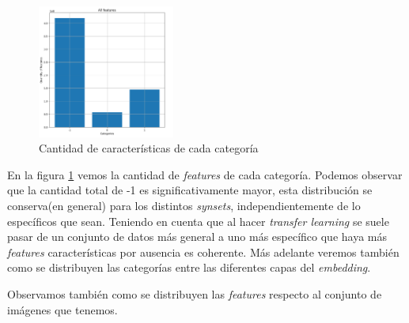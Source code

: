 \documentclass[12,twoside]{TFG-GM}
\theoremstyle{definition}
\theoremstyle{remark}
\begin{document}
\begin{figure}[ht] 
	\centering
	\includegraphics[width=0.4\textwidth] {Images/plots/25/quantity_of_features_bar.png}
	\caption{ Cantidad de características de cada categoría
	\label{fig:totalfeatures}}


\end{figure}

En la figura \ref{fig:totalfeatures} vemos la cantidad de \textit{features} de cada categoría. Podemos observar que la cantidad total de -1 es significativamente mayor, esta distribución se conserva(en general) para los distintos \textit{synsets}, independientemente de lo específicos que sean. Teniendo en cuenta que al hacer \textit{transfer learning} se suele pasar de un conjunto de datos más general a uno más específico que haya más \textit{features} características por ausencia es coherente. Más adelante veremos también como se distribuyen las categorías entre las diferentes capas del \textit{embedding}. 


Observamos también como se distribuyen las \textit{features} respecto al conjunto de imágenes que tenemos. 
\end{document}
